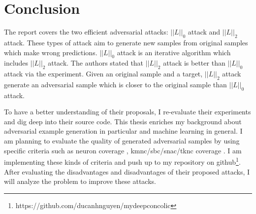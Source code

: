 \documentclass[12pt]{article}
\begin{document}
\section{Conclusion}

The report covers the two efficient adversarial attacks: $||L||_0$ attack and $||L||_2$ attack. These types of attack aim to generate new samples from original samples which make wrong predictions. $||L||_0$ attack is an iterative algorithm which includes $||L||_2$ attack. The authors stated that $||L||_2$ attack is better than $||L||_0$ attack via the experiment. Given an original sample and a target,  $||L||_2$ attack generate an adversarial sample which is closer to the original sample than $||L||_0$ attack. 

To have a better understanding of their proposals, I re-evaluate their experiments and dig deep into their source code. This thesis enriches my background about adversarial example generation in particular and machine learning in general. I am planning to evaluate the quality of generated adversarial samples by using specific criteria such as neuron coverage \cite{DeepXplore}, kmnc/sbc/snac/tknc coverage \cite{deep-gauge}. I am implementing these kinds of criteria and push up to my repository on github\footnote{https://github.com/ducanhnguyen/mydeepconcolic}. After evaluating the disadvantages and disadvantages of their proposed attacks, I will analyze the problem to improve these attacks.


 

\end{document}
